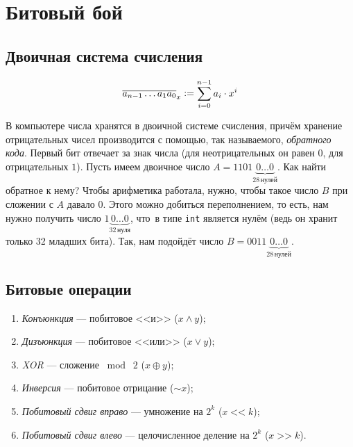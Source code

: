 \section{Битовый бой}

\subsection{Двоичная система счисления}

\begin{definition}
    \[
        \overline{a_{n - 1}\ldots a_1 a_0}_x \vcentcolon = \sum\limits_{i = 0}^{n - 1} a_i\cdot x^i
    \]
\end{definition}

В компьютере числа хранятся в двоичной системе счисления, причём хранение отрицательных чисел производится с помощью, так называемого, \textit{обратного кода}. Первый бит отвечает за знак числа (для неотрицательных он равен $0$, для отрицательных $1$). Пусть имеем двоичное число  $A = 1101\underbrace{0\ldots0}_{28\, \text{нулей}}$. Как найти обратное к нему? Чтобы арифметика работала, нужно, чтобы такое число $B$ при сложении с $A$ давало $0$. Этого можно добиться переполнением, то есть, нам нужно получить число $1\underbrace{0\ldots0}_{32\, \text{нуля}}$, что~в типе \texttt{int} является нулём (ведь он хранит только 32 младших бита). Так, нам подойдёт число $B = 0011\underbrace{0\ldots0}_{28\,\text{нулей}}$.

\subsection{Битовые операции}

\begin{definition}
    \begin{enumerate}[nolistsep]
        \item \textit{Конъюнкция} --- побитовое <<и>> ($x \wedge y$);
        \item \textit{Дизъюнкция} --- побитовое <<или>> ($x \vee y$);
        \item \textit{XOR} --- сложение $\bmod\;2$ ($x \oplus y$);
        \item \textit{Инверсия} --- побитовое отрицание ($\sim x$);
        \item \textit{Побитовый сдвиг вправо} --- умножение на $2^k$ ($x\;\texttt{<<}\;k$);
        \item \textit{Побитовый сдвиг влево} --- целочисленное деление на $2^k$ ($x\;\texttt{>>}\;k$).
    \end{enumerate}
\end{definition}





